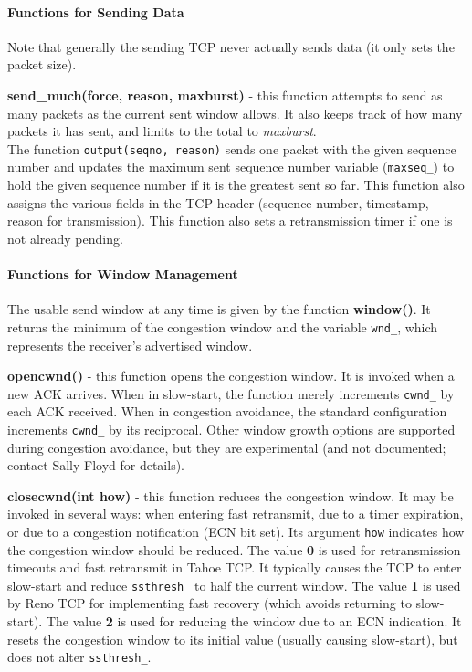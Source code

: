 \paragraph{Functions for Sending Data}
Note that generally the sending TCP never actually sends
data (it only sets the packet size).

{\bf send\_much(force, reason, maxburst)} - this function
attempts to send as many packets as the current sent window allows.
It also keeps track of how many packets it has sent, and limits to the
total to {\em maxburst}. \\
The function {\tt output(seqno, reason)} sends one packet
with the given sequence number and updates the maximum sent sequence
number variable ({\tt maxseq\_}) to hold the given sequence number if
it is the greatest sent so far.
This function also assigns the various fields in the TCP
header (sequence number, timestamp, reason for transmission).
This function also sets a retransmission timer if one is not already
pending.

\paragraph{Functions for Window Management}

The usable send window at any time is given by the function {\bf window()}.
It returns the minimum of the congestion window and the variable {\tt wnd\_},
which represents the receiver's advertised window.

{\bf opencwnd()} - this function opens the congestion window.  It is invoked
when a new ACK arrives.
When in slow-start, the function merely increments {\tt cwnd\_} by each
ACK received.
When in congestion avoidance, the standard configuration increments {\tt cwnd\_}
by its reciprocal.
Other window growth options are supported during congestion avoidance,
but they are experimental (and not documented; contact Sally Floyd for
details).

{\bf closecwnd(int how)} - this function reduces the congestion window. It
may be invoked in several ways: when entering fast retransmit, due to
a timer expiration, or due to a congestion notification (ECN bit set).
Its argument {\tt how} indicates how the congestion window should
be reduced.  The value {\bf 0} is used for retransmission timeouts and
fast retransmit in Tahoe TCP.  It typically causes the TCP to enter
slow-start and reduce {\tt ssthresh\_} to half the current window.
The value {\bf 1} is used by Reno TCP for implementing fast recovery
(which avoids returning to slow-start).
The value {\bf 2} is used for reducing the window due to an ECN indication.
It resets the congestion window to its initial value (usually causing
slow-start), but does not alter {\tt ssthresh\_}.

